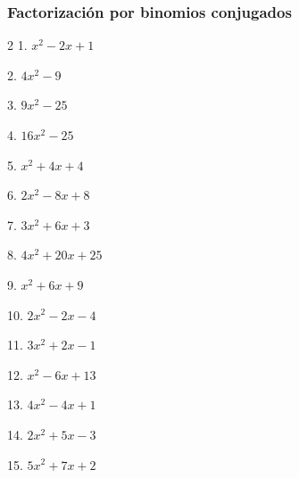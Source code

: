 \documentclass[12pt]{article}
\begin{document}
\subsubsection{Factorización por binomios
conjugados}\label{factorizaciuxf3n-por-binomios-conjugados}
\begin{multicols}{2}
1. $x^2 - 2x + 1$

2. $4x^2 - 9$

3. $9x^2 - 25$

4. $16x^2 - 25$

5. $x^2 + 4x + 4$

6. $2x^2 - 8x + 8$

7. $3x^2 + 6x + 3$

8. $4x^2 + 20x + 25$

9. $x^2 + 6x + 9$

10. $2x^2 - 2x - 4$

11. $3x^2 + 2x - 1$

12. $x^2 - 6x + 13$

13. $4x^2 - 4x + 1$

14. $2x^2 + 5x - 3$

15. $5x^2 + 7x + 2$
\end{multicols}
\end{document}
